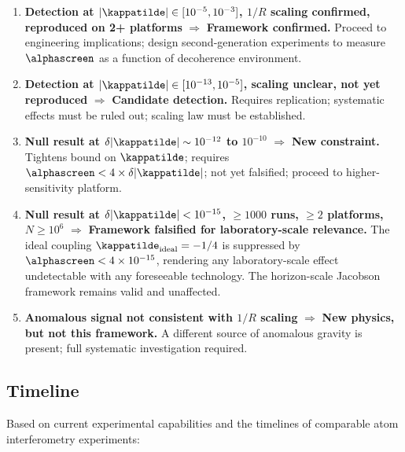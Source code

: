 \begin{enumerate}
    \item \textbf{Detection at $|\kappatilde|\in[10^{-5},10^{-3}]$,
    $1/R$ scaling confirmed, reproduced on 2+ platforms}
    $\Rightarrow$ \textbf{Framework confirmed.} Proceed to engineering
    implications; design second-generation experiments to measure
    $\alphascreen$ as a function of decoherence environment.

    \item \textbf{Detection at $|\kappatilde|\in[10^{-13},10^{-5}]$,
    scaling unclear, not yet reproduced}
    $\Rightarrow$ \textbf{Candidate detection.} Requires replication;
    systematic effects must be ruled out; scaling law must be established.

    \item \textbf{Null result at $\delta|\kappatilde|\sim10^{-12}$ to
    $10^{-10}$}
    $\Rightarrow$ \textbf{New constraint.} Tightens bound on $\kappatilde$;
    requires $\alphascreen < 4\times\delta|\kappatilde|$; not yet
    falsified; proceed to higher-sensitivity platform.

    \item \textbf{Null result at $\delta|\kappatilde| < 10^{-15}$,
    $\geq 1000$ runs, $\geq 2$ platforms, $N\geq 10^6$}
    $\Rightarrow$ \textbf{Framework falsified for laboratory-scale
    relevance.} The ideal coupling $\kappatilde_{\mathrm{ideal}} = -1/4$
    is suppressed by $\alphascreen < 4\times10^{-15}$, rendering any
    laboratory-scale effect undetectable with any foreseeable technology.
    The horizon-scale Jacobson framework remains valid and unaffected.

    \item \textbf{Anomalous signal not consistent with $1/R$ scaling}
    $\Rightarrow$ \textbf{New physics, but not this framework.}
    A different source of anomalous gravity is present; full systematic
    investigation required.
\end{enumerate}

\subsection{Timeline}
\label{subsec:timeline}

Based on current experimental capabilities and the timelines of
comparable atom interferometry experiments:

